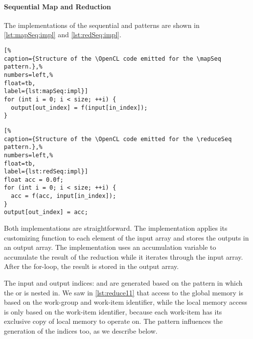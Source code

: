 \paragraph{Sequential Map and Reduction}
The \OpenCL implementations of the sequential \mapSeq and \reduceSeq patterns are shown in \autoref{lst:mapSeq:impl} and \autoref{lst:redSeq:impl}.
%
\begin{lstlisting}[%                                                             
caption={Structure of the \OpenCL code emitted for the \mapSeq pattern.},%
numbers=left,%
float=tb,
label={lst:mapSeq:impl}]
for (int i = 0; i < size; ++i) {
  output[out_index] = f(input[in_index]);
}
\end{lstlisting}
%
%
\begin{lstlisting}[%                                                             
caption={Structure of the \OpenCL code emitted for the \reduceSeq pattern.},%
numbers=left,%
float=tb,
label={lst:redSeq:impl}]
float acc = 0.0f;
for (int i = 0; i < size; ++i) {
  acc = f(acc, input[in_index]);
}
output[out_index] = acc;
\end{lstlisting}
%
Both implementations are straightforward.
The \mapSeq implementation applies its customizing function to each element of the input array and stores the outputs in an output array.
The \reduceSeq implementation uses an accumulation variable to accumulate the result of the reduction while it iterates through the input array.
After the for-loop, the result is stored in the output array.

The input and output indices:  and  are generated based on the pattern in which the \mapSeq or \reduceSeq is nested in.
We saw in \autoref{lst:reduce11} that access to the global memory is based on the work-group and work-item identifier, while the local memory access is only based on the work-item identifier, because each work-item has its exclusive copy of local memory to operate on.
The \reorderStride pattern influences the generation of the indices too, as we describe below.

